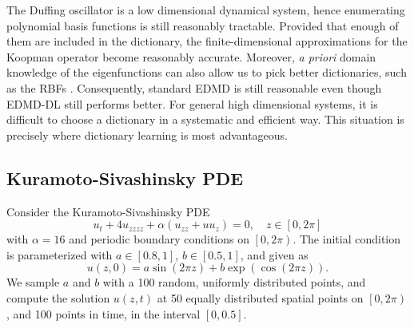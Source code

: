 \documentclass[%
 aip,
 cha,
 sd,%
 amsmath,amssymb,
 preprint,%
]{revtex4-1}
\begin{document}
The Duffing oscillator is a low dimensional dynamical system, hence enumerating polynomial basis functions is still reasonably tractable.  Provided that enough of them are included in the dictionary, the finite-dimensional approximations for the Koopman operator become reasonably accurate. Moreover, {\it a priori} domain knowledge of the eigenfunctions can also allow us to pick better dictionaries, such as the RBFs \cite{williams2015data}. Consequently, standard EDMD is still reasonable even though EDMD-DL still performs better. 
For general high dimensional systems, it is difficult to choose a dictionary in a systematic and efficient way. This situation is precisely where dictionary learning is most advantageous. 

\subsection{Kuramoto-Sivashinsky PDE}
Consider the Kuramoto-Sivashinsky PDE
\begin{equation}
u_t + 4 u_{zzzz} + \alpha( u_{zz} + uu_z ) = 0, \quad z\in[0, 2\pi]
\end{equation}
with $\alpha=16$ and periodic boundary conditions on $\left[0,2\pi\right)$. The initial condition is parameterized with $a\in[0.8,1]$, $b\in[0.5,1]$, and given as
\begin{equation}
u(z,0)=a\sin(2\pi z)+b\exp(\cos(2\pi z)).
\end{equation}
We sample $a$ and $b$ with a 100 random, uniformly distributed points, and compute the solution $u(z,t)$ at 50 equally distributed spatial points on $\left[0,2\pi\right)$, and 100 points in time, in the interval $\left[0,0.5\right]$.
\end{document}
